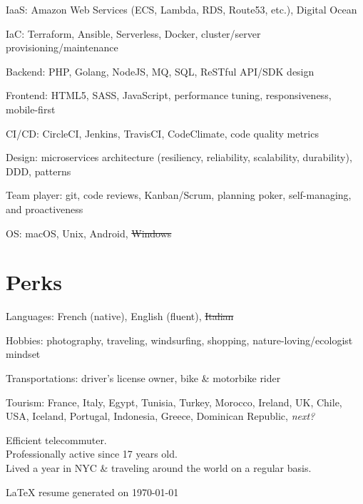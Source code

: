 \documentclass[letterpaper]{article}
\renewenvironment{itemize}{
    \begin{list}{}{
        \setlength{\leftmargin}{1.5em}
    }
}{
    \end{list}
}
\begin{document}
        \begin{itemize}
            \item IaaS: Amazon Web Services (ECS, Lambda, RDS, Route53, etc.), Digital Ocean
            \item IaC: Terraform, Ansible, Serverless, Docker, cluster/server provisioning/maintenance
            \item Backend: PHP, Golang, NodeJS, MQ, SQL, ReSTful API/SDK design
            \item Frontend: HTML5, SASS, JavaScript, performance tuning, responsiveness, mobile-first
            \item CI/CD: CircleCI, Jenkins, TravisCI, CodeClimate, code quality metrics
            \item Design: microservices architecture (resiliency, reliability, scalability, durability), DDD, patterns
            \item Team player: git, code reviews, Kanban/Scrum, planning poker, self-managing, and proactiveness
            \item OS: macOS, Unix, Android, \sout{Windows}
        \end{itemize}

        \vspace{0.6cm}

    \section*{\faCompass{} Perks}

        \begin{itemize}
            \item Languages: French (native), English (fluent), \sout{Italian}
            \item Hobbies: photography, traveling, windsurfing, shopping, nature-loving/ecologist mindset
            \item Transportations: driver's license owner, bike \& motorbike rider
            \item Tourism: France, Italy, Egypt, Tunisia, Turkey, Morocco, Ireland, UK, Chile, USA, Iceland, Portugal, Indonesia, Greece, Dominican Republic, \emph{next?}
        \end{itemize}

        \vspace{1cm}
        Efficient telecommuter.\\
        Professionally active since 17 years old.\\
        Lived a year in NYC \& traveling around the world on a regular basis.\\

        \vspace*{\fill}

        \begin{center}
            \begin{footnotesize}
                \LaTeX{} resume generated on \today
            \end{footnotesize}
        \end{center}
\end{document}
